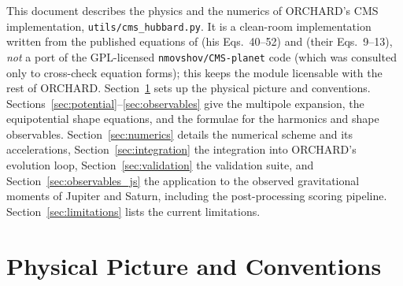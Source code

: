 \documentclass{aastex631}
\begin{document}
This document describes the physics and the numerics of ORCHARD's CMS
implementation, \texttt{utils/cms\_hubbard.py}.  It is a clean-room
implementation written from the published equations of
\citet{Hubbard2013} (his Eqs.~40--52) and \citet{MilitzerHubbard2024}
(their Eqs.~9--13), \emph{not} a port of the GPL-licensed
\texttt{nmovshov/CMS-planet} code (which was consulted only to
cross-check equation forms); this keeps the module licensable with the
rest of ORCHARD.  Section~\ref{sec:physics} sets up the physical picture
and conventions.  Sections~\ref{sec:potential}--\ref{sec:observables}
give the multipole expansion, the equipotential shape equations, and the
formulae for the harmonics and shape observables.
Section~\ref{sec:numerics} details the numerical scheme and its
accelerations, Section~\ref{sec:integration} the integration into
ORCHARD's evolution loop, Section~\ref{sec:validation} the validation
suite, and Section~\ref{sec:observables_js} the application to the
observed gravitational moments of Jupiter and Saturn, including the
post-processing scoring pipeline.  Section~\ref{sec:limitations} lists
the current limitations.

\section{Physical Picture and Conventions}\label{sec:physics}
\end{document}
